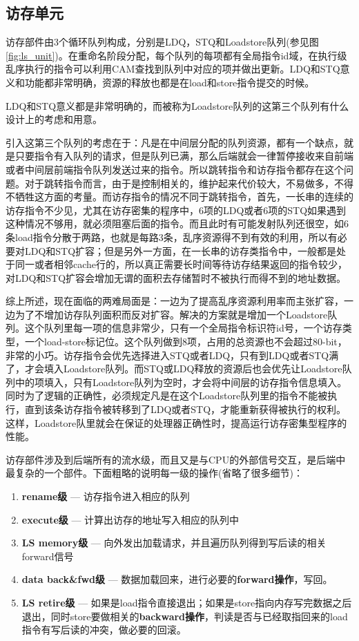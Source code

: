 \subsection{访存单元}\label{subsec:ls_unit}

访存部件由3个循环队列构成，分别是LDQ，STQ和Loadstore队列(参见图\ref{fig:ls_unit})。在重命名阶段分配，每个队列的每项都有全局指令id域，在执行级乱序执行的指令可以利用CAM查找到队列中对应的项并做出更新。LDQ和STQ意义和功能都非常明确，资源的释放也都是在load和store指令提交的时候。

LDQ和STQ意义都是非常明确的，而被称为Loadstore队列的这第三个队列有什么设计上的考虑和用意。

引入这第三个队列的考虑在于：凡是在中间层分配的队列资源，都有一个缺点，就是只要指令有入队列的请求，但是队列已满，那么后端就会一律暂停接收来自前端或者中间层前端指令队列发送过来的指令。所以跳转指令和访存指令都存在这个问题。对于跳转指令而言，由于是控制相关的，维护起来代价较大，不易做多，不得不牺牲这方面的考量。而访存指令的情况不同于跳转指令，首先，一长串的连续的访存指令不少见，尤其在访存密集的程序中，6项的LDQ或者6项的STQ如果遇到这种情况不够用，就必须阻塞后面的指令。而且此时有可能发射队列还很空，如6条load指令分散于两路，也就是每路3条，乱序资源得不到有效的利用，所以有必要对LDQ和STQ扩容；但是另外一方面，在一长串的访存类指令中，一般都是处于同一或者相邻cache行的，所以真正需要长时间等待访存结果返回的指令较少，对LDQ和STQ扩容会增加无谓的面积去存储暂时不被执行而得不到的地址数据。

综上所述，现在面临的两难局面是：一边为了提高乱序资源利用率而主张扩容，一边为了不增加访存队列面积而反对扩容。解决的方案就是增加一个Loadstore队列。这个队列里每一项的信息非常少，只有一个全局指令标识符id号，一个访存类型，一个load-store标记位。这个队列做到8项，占用的总资源也不会超过80-bit，非常的小巧。访存指令会优先选择进入STQ或者LDQ，只有到LDQ或者STQ满了，才会填入Loadstore队列。而STQ或LDQ释放的资源后也会优先让Loadstore队列中的项填入，只有Loadstore队列为空时，才会将中间层的访存指令信息填入。同时为了逻辑的正确性，必须规定凡是在这个Loadstore队列里的指令不能被执行，直到该条访存指令被转移到了LDQ或者STQ，才能重新获得被执行的权利。这样，Loadstore队里就会在保证的处理器正确性时，提高运行访存密集型程序的性能。

访存部件涉及到后端所有的流水级，而且又是与CPU的外部信号交互，是后端中最复杂的一个部件。下面粗略的说明每一级的操作(省略了很多细节)：
\begin{enumerate}[label=(\alph*)]
	\item \textbf{rename级} --- 访存指令进入相应的队列
	\item \textbf{execute级} --- 计算出访存的地址写入相应的队列中
	\item \textbf{LS memory级} --- 向外发出加载请求，并且遍历队列得到写后读的相关forward信号
	\item \textbf{data back\&fwd级} --- 数据加载回来，进行必要的\textbf{forward操作}，写回。
	\item \textbf{LS retire级} --- 如果是load指令直接退出；如果是store指向内存写完数据之后退出，同时store要做相关的\textbf{backward操作}，判读是否与已经取指回来的load指令有写后读的冲突，做必要的回滚。
\end{enumerate}

